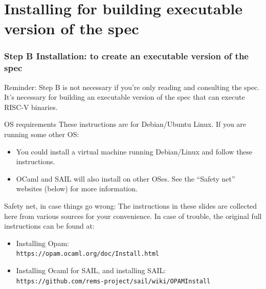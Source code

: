 \documentclass[aspectratio=169]{beamer}
\newcommand{\hm}{\hspace*{1em}}
\newcommand{\scripttt}{\scriptsize\tt}
\begin{document}

\section{Installing for building executable version of the spec}

\begin{frame}
  \frametitle{Step B Installation: to create an executable version of the spec}

  {\scriptsize Reminder: Step B is not necessary if you're only
    reading and consulting the spec.  It's necessary for building an
    executable version of the spec that can execute RISC-V binaries.}

  \begin{block}{OS requirements}
    \scriptsize
    These instructions are for Debian/Ubuntu Linux.  If you are running some other OS:
    \begin{itemize}
      \item You could install a virtual machine running Debian/Linux and follow these instructions.


      \item OCaml and SAIL will also install on other OSes.  See the ``Safety
        net'' websites (below) for more information.

    \end{itemize}
  \end{block}

  \begin{block}{Safety net, in case things go wrong:}
    \scriptsize
    The instructions in these slides are collected here from various
    sources for your convenience. In case of trouble, the original
    full instructions can be found at:

    \begin{itemize}

      \item Installing Opam: \\
        {\scripttt\hm https://opam.ocaml.org/doc/Install.html}

      \item Installing Ocaml for SAIL, and installing SAIL: \\
        {\scripttt\hm https://github.com/rems-project/sail/wiki/OPAMInstall}

    \end{itemize}
  \end{block}

\end{frame}
\end{document}
